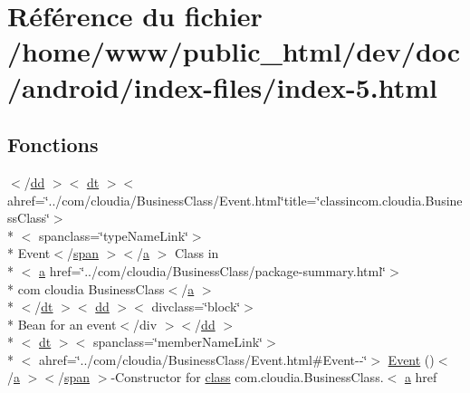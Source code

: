 \hypertarget{index-5_8html}{\section{Référence du fichier /home/www/public\-\_\-html/dev/doc/android/index-\/files/index-\/5.html}
\label{index-5_8html}
}
\subsection*{Fonctions}
\begin{DoxyCompactItemize}
\item 
$<$/\hyperlink{stylesheet_8css_a47f4718a86835a7771ec592ece845221}{dd} $>$$<$ \hyperlink{stylesheet_8css_a107565fb4039d33b041380d6e0ea1d80}{dt} $>$$<$ ahref=\char`\"{}../com/cloudia/Business\-Class/Event.\-html\char`\"{}title=\char`\"{}classincom.\-cloudia.\-Business\-Class\char`\"{}$>$\\*
$<$ spanclass=\char`\"{}type\-Name\-Link\char`\"{}$>$\\*
 Event$<$/\hyperlink{stylesheet_8css_a8343996ebcf16220b04e54659aac31cc}{span} $>$$<$/\hyperlink{style_8css_a5e8981582017bb8b84c21f148345d1f7}{a} $>$ Class in\\*
$<$ \hyperlink{style_8css_a5e8981582017bb8b84c21f148345d1f7}{a} href=\char`\"{}../com/cloudia/Business\-Class/package-\/summary.\-html\char`\"{}$>$\\*
 com cloudia Business\-Class$<$/\hyperlink{style_8css_a5e8981582017bb8b84c21f148345d1f7}{a} $>$\\*
$<$/\hyperlink{stylesheet_8css_a107565fb4039d33b041380d6e0ea1d80}{dt} $>$$<$ \hyperlink{stylesheet_8css_a47f4718a86835a7771ec592ece845221}{dd} $>$$<$ divclass=\char`\"{}block\char`\"{}$>$\\*
 Bean for an event$<$/div $>$$<$/\hyperlink{stylesheet_8css_a47f4718a86835a7771ec592ece845221}{dd} $>$\\*
$<$ \hyperlink{stylesheet_8css_a107565fb4039d33b041380d6e0ea1d80}{dt} $>$$<$ spanclass=\char`\"{}member\-Name\-Link\char`\"{}$>$\\*
$<$ ahref=\char`\"{}../com/cloudia/Business\-Class/Event.\-html\#Event-\/-\/\char`\"{}$>$ \hyperlink{index-5_8html_a25cf9659160eb47e6daacdaf21baa4be}{Event} ()$<$/\hyperlink{style_8css_a5e8981582017bb8b84c21f148345d1f7}{a} $>$$<$/\hyperlink{stylesheet_8css_a8343996ebcf16220b04e54659aac31cc}{span} $>$-\/Constructor for \hyperlink{_tools_8html_acf06f836132665ba8114f5a414c2403f}{class} com.\-cloudia.\-Business\-Class.$<$ \hyperlink{style_8css_a5e8981582017bb8b84c21f148345d1f7}{a} href
\end{DoxyCompactItemize}
